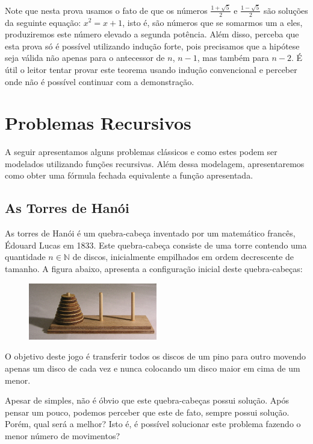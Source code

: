 Note que nesta prova usamos o fato de que os números $\frac{1 +
  \sqrt{5}}{2}$ e $\frac{1 -\sqrt{5}}{2}$ são soluções da seguinte
equação: $x^2 = x + 1$, isto é, são números que se somarmos um a eles,
produziremos este número elevado a segunda potência. Além disso,
perceba que esta
prova só é possível utilizando indução forte, pois precisamos que a
hipótese seja válida não apenas para o antecessor de $n$, $ n - 1$,
mas também para $n - 2$. É útil o leitor tentar provar este teorema
usando indução convencional e perceber onde não é possível continuar
com a demonstração.

\section{Problemas Recursivos}

A seguir apresentamos alguns problemas clássicos e como estes podem
ser modelados utilizando funções recursivas. Além dessa modelagem,
apresentaremos como obter uma fórmula fechada equivalente a função apresentada.

\subsection{As Torres de Hanói}\label{hanoi}

As torres de Hanói é um quebra-cabeça inventado por um matemático
francês, Édouard Lucas em 1833.  Este quebra-cabeça consiste de uma
torre contendo uma quantidade $n\in\mathbb{N}$ de discos, inicialmente
empilhados em ordem decrescente de tamanho. A figura abaixo, apresenta
a configuração inicial deste quebra-cabeças:

\begin{figure}[h!]
  \centering
      \includegraphics[width=0.5\textwidth]{imagens/torredehanoi.jpg}
 \end{figure}
O objetivo deste jogo é transferir todos os discos de um pino para
outro movendo apenas um disco de cada vez e nunca colocando um disco
maior em cima de um menor.

Apesar de simples, não é óbvio que este quebra-cabeças possui
solução. Após pensar um pouco, podemos perceber que este de fato,
sempre possui solução. Porém, qual será a melhor? Isto é, é possível
solucionar este problema fazendo o menor número de movimentos?

